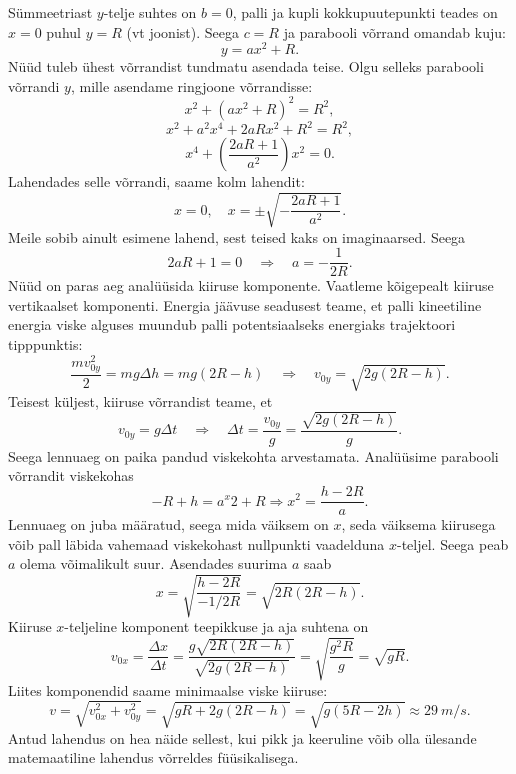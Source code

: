 {Sümmeetriast $y$-telje suhtes on $b = 0$, palli ja kupli kokkupuutepunkti teades on $x = 0$ puhul $y = R$ (vt joonist). Seega $c = R$ ja parabooli võrrand omandab kuju:
\[
y = ax^2 + R.
\]
Nüüd tuleb ühest võrrandist tundmatu asendada teise. Olgu selleks parabooli võrrandi $y$, mille asendame ringjoone võrrandisse:
\[
x^{2}+\left(a x^{2}+R\right)^{2}=R^{2},
\]
\[
x^{2}+a^{2} x^{4}+2 a R x^{2}+R^{2}=R^{2},
\]
\[
x^{4}+\left(\frac{2 a R+1}{a^{2}}\right) x^{2}=0.
\]
Lahendades selle võrrandi, saame kolm lahendit:
\[
x=0, \quad x=\pm \sqrt{-\frac{2 a R+1}{a^{2}}}.
\]
Meile sobib ainult esimene lahend, sest teised kaks on imaginaarsed. Seega
\[
2aR + 1 = 0 \quad\Rightarrow\quad a = - \frac{1}{2R}.
\]
Nüüd on paras aeg analüüsida kiiruse komponente. Vaatleme kõigepealt kiiruse vertikaalset komponenti. Energia jäävuse seadusest teame, et palli kineetiline energia viske alguses muundub palli potentsiaalseks energiaks trajektoori tipppunktis:
\[
\frac{m v_{0 y}^{2}}{2}=m g \Delta h=m g(2 R-h) \quad\Rightarrow\quad v_{0 y}=\sqrt{2 g(2 R-h)}.
\]
Teisest küljest, kiiruse võrrandist teame, et
\[
v_{0 y}=g \Delta t \quad \Rightarrow \quad \Delta t=\frac{v_{0 y}}{g}=\frac{\sqrt{2 g(2 R-h)}}{g}.
\]
Seega lennuaeg on paika pandud viskekohta arvestamata. Analüüsime parabooli võrrandit viskekohas
\[
-R + h = a^x2 + R \Rightarrow x^2 = \frac{h-2R}{a}.
\]
Lennuaeg on juba määratud, seega mida väiksem on $x$, seda väiksema kiirusega võib pall läbida vahemaad viskekohast nullpunkti vaadelduna $x$-teljel. Seega peab $a$ olema võimalikult suur. Asendades suurima $a$ saab
\[
x=\sqrt{\frac{h-2 R}{-1 / 2 R}}=\sqrt{2 R(2 R-h)}.
\]
Kiiruse $x$-teljeline komponent teepikkuse ja aja suhtena on
\[
v_{0 x}=\frac{\Delta x}{\Delta t}=\frac{g \sqrt{2 R(2 R-h)}}{\sqrt{2 g(2 R-h)}}=\sqrt{\frac{g^{2} R}{g}}=\sqrt{g R}.
\]
Liites komponendid saame minimaalse viske kiiruse:
\[
v=\sqrt{v_{0 x}^{2}+v_{0 y}^{2}}=\sqrt{g R+2 g(2 R-h)}=\sqrt{g(5 R-2 h)} \approx \SI{29}{m/s}.
\]
Antud lahendus on hea näide sellest, kui pikk ja keeruline võib olla ülesande matemaatiline lahendus võrreldes füüsikalisega.
\fi
}